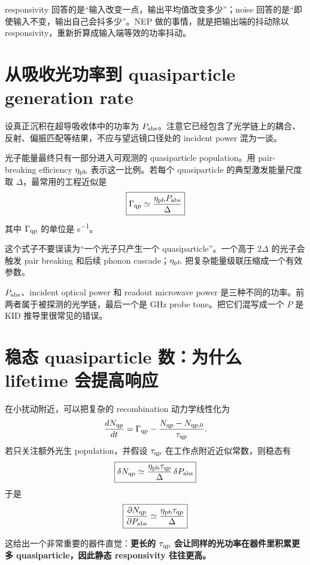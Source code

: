 \documentclass[11pt,a4paper,openany]{ctexrep}
\begin{document}
\begin{intuitionbox}
responsivity 回答的是“输入改变一点，输出平均值改变多少”；noise 回答的是“即使输入不变，输出自己会抖多少”。NEP 做的事情，就是把输出端的抖动除以 responsivity，重新折算成输入端等效的功率抖动。
\end{intuitionbox}

\section{从吸收光功率到 quasiparticle generation rate}

设真正沉积在超导吸收体中的功率为 $P_{\rm abs}$。注意它已经包含了光学链上的耦合、反射、偏振匹配等结果，不应与望远镜口径处的 incident power 混为一谈。

光子能量最终只有一部分进入可观测的 quasiparticle population。用 pair-breaking efficiency $\eta_{\rm pb}$ 表示这一比例。若每个 quasiparticle 的典型激发能量尺度取 $\Delta$，最常用的工程近似是
\[
\boxed{\Gamma_{\rm qp}\simeq \frac{\eta_{\rm pb}P_{\rm abs}}{\Delta}}
\]
其中 $\Gamma_{\rm qp}$ 的单位是 \si{s^{-1}}。

这个式子不要误读为“一个光子只产生一个 quasiparticle”。一个高于 $2\Delta$ 的光子会触发 pair breaking 和后续 phonon cascade；$\eta_{\rm pb}$ 把复杂能量级联压缩成一个有效参数。

\begin{mistakebox}
$P_{\rm abs}$、incident optical power 和 readout microwave power 是三种不同的功率。前两者属于被探测的光学链，最后一个是 GHz probe tone。把它们混写成一个 $P$ 是 KID 推导里很常见的错误。
\end{mistakebox}

\section{稳态 quasiparticle 数：为什么 lifetime 会提高响应}

在小扰动附近，可以把复杂的 recombination 动力学线性化为
\[
\frac{dN_{\rm qp}}{dt}=\Gamma_{\rm qp}-\frac{N_{\rm qp}-N_{\rm qp,0}}{\tau_{\rm qp}}.
\]
若只关注额外光生 population，并假设 $\tau_{\rm qp}$ 在工作点附近近似常数，则稳态有
\[
\boxed{
\delta N_{\rm qp}
\simeq
\frac{\eta_{\rm pb}\tau_{\rm qp}}{\Delta}
\,\delta P_{\rm abs}
}
\]
于是
\[
\boxed{
\frac{\partial N_{\rm qp}}{\partial P_{\rm abs}}
\simeq
\frac{\eta_{\rm pb}\tau_{\rm qp}}{\Delta}
}
\]

这给出一个非常重要的器件直觉：\textbf{更长的 $\tau_{\rm qp}$ 会让同样的光功率在器件里积累更多 quasiparticle，因此静态 responsivity 往往更高。}
\end{document}
